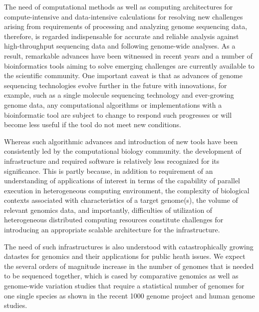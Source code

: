 \documentclass{acm_proc_article-sp}
\begin{document}
The need of computational methods as well as computing architectures
for compute-intensive and data-intensive calculations for resolving
new challenges arising from requirements of processing and analyzing
genome sequencing data, therefore, is regarded indispensable for
accurate and reliable analysis against high-throughput sequencing data
and following genome-wide analyses.  As a result, remarkable advances
have been witnessed in recent years and a number of bioinformatics
tools aiming to solve emerging challenges are currently available to
the scientific
community\cite{trapnell2009,bfast2009,scheibye-alsing2009,pepke2009,samtools}.
One important caveat is that as advances of genome sequencing
technologies evolve further in the future with innovations, for
example, such as a single molecule sequencing technology and
ever-growing genome data, any computational algorithms or
implementations with a bioinformatic tool are subject to change to
respond such progresses or will become less useful if the tool do not
meet new conditions.

Whereas such algorithmic advances and introduction of new tools have been consistently led by the computational biology community. the development of infrastructure and required software is relatively less recognized for its significance.  This is partly because, in addition to requirement of an understanding of applications of interest in terms of the capability of parallel execution in heterogeneous computing environment, the complexity of biological contexts associated with characteristics of a target genome(s), the volume of relevant genomics data, and importantly, difficulties of utilization of heterogeneous distributed computing resources constitute challenges for introducing an appropriate scalable architecture for the infrastructure.

The need of such infrastructures is also understood with catastrophically growing datastes for genomics and their applications for public heath issues.  We expect the several orders of magnitude increase in the number of genomes that is needed to be sequenced together, which is cased by comparative genomics as well as genome-wide variation studies that require a statistical number of genomes for one single species as shown in the recent 1000 genome project and human genome studies\cite{1000genome,mardis2008-tig,gilad2009,alex2009,kim2011}. 

\end{document}
